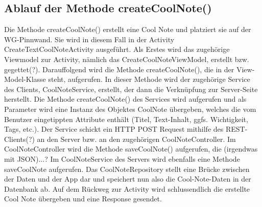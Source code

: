 \subsection{Ablauf der Methode createCoolNote()}

Die Methode createCoolNote() erstellt eine Cool Note und platziert sie auf der WG-Pinnwand. Sie wird in diesem Fall in der Activity CreateTextCoolNoteActivity ausgeführt. Als Erstes wird das zugehörige Viewmodel zur Activity, nämlich das CreateCoolNoteViewModel, erstellt bzw. gegettet(?). Darauffolgend wird die Methode createCoolNote(), die in der View-Model-Klasse steht, aufgerufen. In dieser Methode wird der zugehörige Service des Clients, CoolNoteService, erstellt, der dann die Verknüpfung zur Server-Seite herstellt. Die Methode createCoolNote() des Services wird aufgerufen und als Parameter wird eine Instanz des Objektes CoolNote übergeben, welches die vom Benutzer eingetippten Attribute enthält (Titel, Text-Inhalt, ggfs. Wichtigkeit, Tags, etc.). Der Service schickt ein HTTP POST Request mithilfe des REST-Clients(?) an den Server bzw. an den zugehörigen CoolNoteController. Im CoolNoteController wird die Methode saveCoolNote() aufgerufen, die (irgendwas mit JSON)...? Im CoolNoteService des Servers wird ebenfalls eine Methode saveCoolNote aufgerufen. Das CoolNoteRepository stellt eine Brücke zwischen der Daten und der App dar und speichert nun also die Cool-Note-Daten in der Datenbank ab. Auf dem Rückweg zur Activity wird schlussendlich die erstellte Cool Note übergeben und eine Response gesendet.